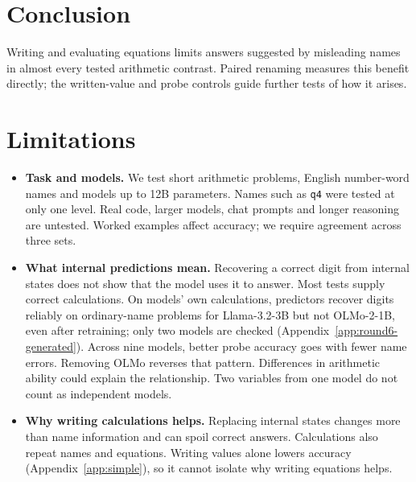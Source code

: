 \documentclass[11pt]{article}
\begin{document}
\section{Conclusion}

Writing and evaluating equations limits answers suggested by misleading names in almost
every tested arithmetic contrast. Paired renaming measures this benefit directly;
the written-value and probe controls guide further tests of how it arises.

\section*{Limitations}

\begin{itemize}
\item \textbf{Task and models.} We test short arithmetic problems, English number-word names and
models up to 12B parameters. Names such as \texttt{q4} were tested at only one level. Real code,
larger models, chat prompts and longer reasoning are untested. Worked examples affect
accuracy; we require agreement across three sets.
\item \textbf{What internal predictions mean.} Recovering a correct digit from internal
states does not show that the model uses it to answer. Most tests supply correct
calculations. On models' own calculations, predictors recover digits reliably on
ordinary-name problems for Llama-3.2-3B but not OLMo-2-1B, even after retraining;
only two models are checked (Appendix~\ref{app:round6-generated}). Across nine models,
better probe accuracy goes with fewer name errors. Removing OLMo reverses that pattern.
Differences in arithmetic ability could explain the relationship. Two variables from
one model do not count as independent models.
\item \textbf{Why writing calculations helps.} Replacing internal states changes more than
name information and can spoil correct answers. Calculations also repeat names and
equations. Writing values alone lowers accuracy (Appendix~\ref{app:simple}), so it
cannot isolate why writing equations helps.
\end{itemize}



\appendix
\clearpage

\end{document}
